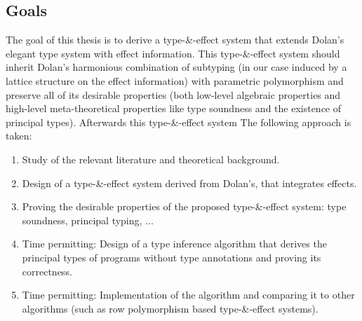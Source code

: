 \subsection{Goals}
The goal of this thesis is to derive a type-\&-effect system that extends Dolan's elegant type system with effect information. This type-\&-effect system should inherit Dolan's harmonious combination of subtyping (in our case induced by a lattice structure on the effect information) with parametric polymorphism and preserve all of its desirable properties (both low-level algebraic properties and high-level meta-theoretical properties like type soundness and the existence of principal types). Afterwards this type-\&-effect system The following approach is taken:
\begin{enumerate}
\item Study of the relevant literature and theoretical background.
\item Design of a type-\&-effect system derived from Dolan's, that integrates effects.
\item Proving the desirable properties of the proposed type-\&-effect system: type soundness, principal typing, ...
\item Time permitting: Design of a type inference algorithm that derives the principal types of programs without type annotations and proving its correctness.
\item Time permitting: Implementation of the algorithm and comparing it to other algorithms (such as row polymorphism based type-\&-effect systems).
\end{enumerate}
